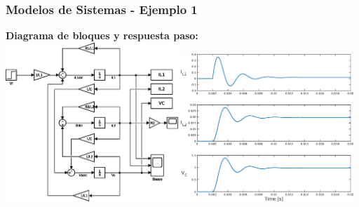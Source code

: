 \documentclass[aspectratio=169,handout]{beamer}
\theoremstyle{definition}
\theoremstyle{plain}
\theoremstyle{remark}
\begin{document}
\begin{frame}[<+->]\frametitle{Modelos de Sistemas - Ejemplo 1}
\textbf{Diagrama de bloques y respuesta paso:}\\
\vspace*{3mm}
\centering
\includegraphics[width=6.5cm]{code/example1_blockdiagram.eps}
\pause
\hspace*{5mm}
\includegraphics[width=6.5cm]{code/example1_stepresponse.eps}
\end{frame}
\end{document}
